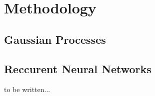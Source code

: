 \section{Methodology}
\subsection{Gaussian Processes}
\subsection{Reccurent Neural Networks}
to be written...